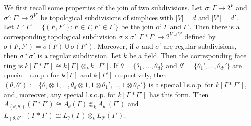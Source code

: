 \documentclass[11pt]{article}
\theoremstyle{definition}
\numberwithin{equation}{section}
\numberwithin{equation}{section}
\begin{document}
We first recall some properties of the join of two subdivisions. 
Let~$\sigma\colon \Gamma \to 2^V$ and $\sigma'\colon \Gamma' \to 2^{V'}$ be topological subdivisions of simplices with $|V| = d$ and $|V'| = d'$. Let $\Gamma * \Gamma' = \{ (F,F') : F \in \Gamma, F' \in \Gamma' \}$ be the join of $\Gamma$ and $\Gamma'$. Then there is a corresponding topological subdivision 
$\sigma \times \sigma' \colon \Gamma * \Gamma' \to 2^{V \sqcup V'}$ defined by $\sigma(F,F') = \sigma(F) \cup \sigma(F')$. Moreover, if $\sigma$ and $\sigma'$ are regular subdivisions, then $\sigma * \sigma'$ is a regular subdivision. Let $k$ be a field.  Then the corresponding face ring is $k[\Gamma * \Gamma'] \cong k[\Gamma] \otimes_k k[\Gamma']$. If 
$\theta = \{ \theta_1, \dotsc, \theta_d \}$ and $\theta' = \{ \theta_1', \dotsc, \theta_{d'}' \}$ are special l.s.o.p.s for  $k[\Gamma]$ and $k[\Gamma']$ respectively, then $(\theta, \theta') := \{ \theta_1 \otimes 1, \dotsc, \theta_d \otimes 1,  1 \otimes \theta_1', \dotsc, 1 \otimes \theta_{d'}' \}$ is a special l.s.o.p. for $k[\Gamma * \Gamma']$, and,   moreover,  any special l.s.o.p. for $k[\Gamma * \Gamma']$ has this form. Then $A_{(\theta, \theta')}(\Gamma * \Gamma') \cong  A_\theta(\Gamma) \otimes_k A_{\theta'}(\Gamma')$ and  $L_{(\theta, \theta')}(\Gamma * \Gamma') \cong  L_\theta(\Gamma) \otimes_k L_{\theta'}(\Gamma')$. 
\end{document}
